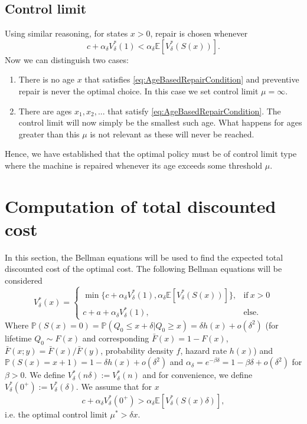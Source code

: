 \documentclass[a4paper]{thesis}
\theoremstyle{definition}
\begin{document}
\subsection{Control limit}
Using similar reasoning, for states $x>0$, repair is chosen whenever
\begin{equation}\label{eq:AgeBasedRepairCondition}
 c+\alpha_\delta V^*_\delta(1) <\alpha_\delta \mathbb{E}[V^*_\delta(S(x))]. 
 \end{equation}
Now we can distinguish two cases:
\begin{enumerate}
	\item There is no age $x$ that satisfies \eqref{eq:AgeBasedRepairCondition} and preventive repair is never the optimal choice.
	In this case we set control limit $\mu=\infty$.
	\item There are ages $x_1,x_2,...$ that satisfy \eqref{eq:AgeBasedRepairCondition}.
	The control limit will now simply be the smallest such age.
	What happens for ages greater than this $\mu$ is not relevant as these will never be reached.
\end{enumerate}
Hence, we have established that the optimal policy must be of control limit type where the machine is repaired whenever its age exceeds some threshold $\mu$. \section{Computation of total discounted cost}
In this section, the Bellman equations will be used to find the expected total discounted cost of the optimal cost.
The following Bellman equations will be considered
\[V_\delta^*(x)=\begin{cases}
\min\{c+\alpha_\delta V^*_\delta(1),\alpha_\delta \mathbb{E}[V^*_\delta(S(x))]\},&\text{if}\ x>0 \\
c+a+\alpha_\delta V^*_\delta(1),&\text{else.}
\end{cases}\]
Where $\mathbb{P}(S(x)=0)=\mathbb{P}(Q_0\leq x+\delta|Q_0\geq x)=\delta h(x)+o(\delta^2)$ (for lifetime $Q_0\sim F(x)$ and corresponding $\bar F(x)=1-F(x)$, $\bar F(x;y)=\bar F(x)/\bar F(y)$, probability density $f$, hazard rate $h(x)$) and $\mathbb{P}(S(x)=x+1)=1-\delta h(x)+o(\delta^2)$ and $\alpha_\delta=e^{-\beta \delta}=1-\beta \delta + o(\delta^2)$ for $\beta>0$.
We define $V^*_\delta(n\delta):=V^*_\delta(n)$ and for convenience, we define $V^*_\delta(0^+):=V^*_\delta(\delta)$.
We assume that for $x$
$$
c+\alpha_\delta V^*_\delta(0^+)>\alpha_\delta \mathbb{E}[V^*_\delta(S(x)\delta)],
$$
i.e. the optimal control limit $\mu^*>\delta x$.
\end{document}
